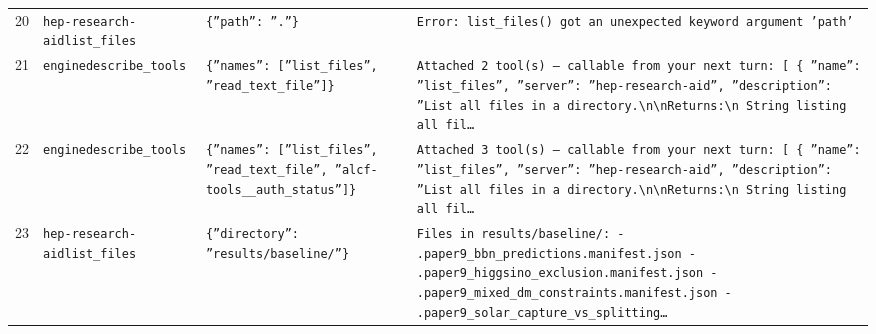 \documentclass[11pt,a4paper]{article}
\begin{document}
\begin{longtable}{@{}p{}p{}p{}p{}@{}}
20 & \texttt{hep-research-aid}\newline\texttt{list\_\allowbreak{}files} & \texttt{\{''path'':\allowbreak{} ''.''\}\allowbreak{}} & \texttt{Error:\allowbreak{} list\_\allowbreak{}files()\allowbreak{} got an unexpected keyword argument 'path'} \\
21 & \texttt{engine}\newline\texttt{describe\_\allowbreak{}tools} & \texttt{\{''names'':\allowbreak{} [''list\_\allowbreak{}files'',\allowbreak{} ''read\_\allowbreak{}text\_\allowbreak{}file'']\allowbreak{}\}\allowbreak{}} & \texttt{Attached 2 tool(s)\allowbreak{} --- callable from your next turn:\allowbreak{} [  \{   ''name'':\allowbreak{} ''list\_\allowbreak{}files'',\allowbreak{}   ''server'':\allowbreak{} ''hep-research-aid'',\allowbreak{}   ''description'':\allowbreak{} ''List all files in a directory.\textbackslash{}\allowbreak{}n\textbackslash{}\allowbreak{}nReturns:\allowbreak{}\textbackslash{}\allowbreak{}n    String listing all fil\ldots{}\allowbreak{}} \\
22 & \texttt{engine}\newline\texttt{describe\_\allowbreak{}tools} & \texttt{\{''names'':\allowbreak{} [''list\_\allowbreak{}files'',\allowbreak{} ''read\_\allowbreak{}text\_\allowbreak{}file'',\allowbreak{} ''alcf-tools\_\allowbreak{}\_\allowbreak{}auth\_\allowbreak{}status'']\allowbreak{}\}\allowbreak{}} & \texttt{Attached 3 tool(s)\allowbreak{} --- callable from your next turn:\allowbreak{} [  \{   ''name'':\allowbreak{} ''list\_\allowbreak{}files'',\allowbreak{}   ''server'':\allowbreak{} ''hep-research-aid'',\allowbreak{}   ''description'':\allowbreak{} ''List all files in a directory.\textbackslash{}\allowbreak{}n\textbackslash{}\allowbreak{}nReturns:\allowbreak{}\textbackslash{}\allowbreak{}n    String listing all fil\ldots{}\allowbreak{}} \\
23 & \texttt{hep-research-aid}\newline\texttt{list\_\allowbreak{}files} & \texttt{\{''directory'':\allowbreak{} ''results/\allowbreak{}baseline/\allowbreak{}''\}\allowbreak{}} & \texttt{Files in results/\allowbreak{}baseline/\allowbreak{}:\allowbreak{}   - .paper9\_\allowbreak{}bbn\_\allowbreak{}predictions.manifest.json   - .paper9\_\allowbreak{}higgsino\_\allowbreak{}exclusion.manifest.json   - .paper9\_\allowbreak{}mixed\_\allowbreak{}dm\_\allowbreak{}constraints.manifest.json   - .paper9\_\allowbreak{}solar\_\allowbreak{}capture\_\allowbreak{}vs\_\allowbreak{}splitting\ldots{}\allowbreak{}} \\

\end{longtable}
\end{document}
